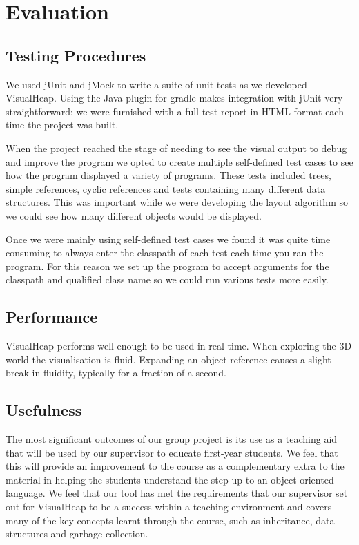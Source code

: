 \documentclass[11pt, a4paper]{report}
\begin{document}
\chapter{Evaluation}

\section{Testing Procedures}

We used jUnit and jMock to write a suite of unit tests as we developed VisualHeap. Using the Java plugin for gradle makes integration with jUnit very straightforward; we were furnished with a full test report in HTML format each time the project was built.

When the project reached the stage of needing to see the visual output to debug and improve the program we opted to create multiple self-defined test cases to see how the program displayed a variety of programs. These tests included trees, simple references, cyclic references and tests containing many different data structures. This was important while we were developing the layout algorithm so we could see how many different objects would be displayed.

Once we were mainly using self-defined test cases we found it was quite time consuming to always enter the classpath of each test each time you ran the program. For this reason we set up the program to accept arguments for the classpath and qualified class name so we could run various tests more easily.

\section{Performance}
VisualHeap performs well enough to be used in real time. When exploring the 3D world the visualisation is fluid. Expanding an object reference causes a slight break in fluidity, typically for a fraction of a second.

\section{Usefulness}
The most significant outcomes of our group project is its use as a teaching aid that will be used by our supervisor to educate first-year students. We feel that this will provide an improvement to the course as a complementary extra to the material in helping the students understand the step up to an object-oriented language. We feel that our tool has met the requirements that our supervisor set out for VisualHeap to be a success within a teaching environment and covers many of the key concepts learnt through the course, such as inheritance, data structures and garbage collection. 
\end{document}
